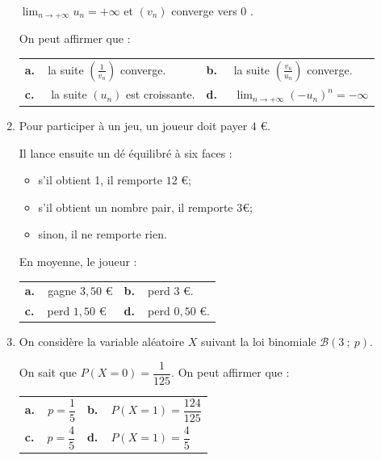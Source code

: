 \begin{enumerate}
$\displaystyle\lim _{n \rightarrow+\infty} u_{n}=+\infty$ et $\left(v_{n}\right)$ converge vers 0 .

On peut affirmer que :

\begin{center}
\begin{tabularx}{\linewidth}{*{2}{X}}
\textbf{a.~~}la suite $\left(\frac{1}{v_{n}}\right)$ converge.&
\textbf{b.~~} la suite $\left(\frac{v_{n}}{u_{n}}\right)$ converge.\\
\textbf{c.~~} la suite $\left(u_{n}\right)$ est croissante.&
\textbf{d.~~} $\displaystyle\lim _{n \rightarrow+\infty}\left(-u_{n}\right)^{n}=-\infty$
\end{tabularx}
\end{center}

\item Pour participer à un jeu, un joueur doit payer $4$ \euro.

Il lance ensuite un dé équilibré à six faces :

\begin{itemize}
\item s'il obtient 1, il remporte $12$ \euro{};
\item s'il obtient un nombre pair, il remporte $3$\euro{};
\item sinon, il ne remporte rien.
\end{itemize}

En moyenne, le joueur :

\begin{center}
\begin{tabularx}{\linewidth}{*{2}{X}}
\textbf{a.~~}gagne $3,50$ \euro&\textbf{b.~~}perd $3$ \euro.\\
\textbf{c.~~}perd $1,50$ \euro&\textbf{d.~~}perd $0,50$ \euro.
\end{tabularx}
\end{center}

\item On considère la variable aléatoire $X$ suivant la loi binomiale $\mathcal{B}(3~;~p)$.

On sait que $P(X = 0) = \dfrac{1}{125}$. On peut affirmer que :

\begin{center}
\renewcommand\arraystretch{1.9}
\begin{tabularx}{\linewidth}{*{2}{X}}
\textbf{a.~~}$p = \dfrac{1}{5}$&\textbf{b.~~}$P(X = 1) =\dfrac{124}{125}$\\
\textbf{c.~~}$p = \dfrac{4}{5}$&\textbf{d.~~}$P(X= 1) =\dfrac{4}{5}$
\end{tabularx}
\end{center}
\end{enumerate}
